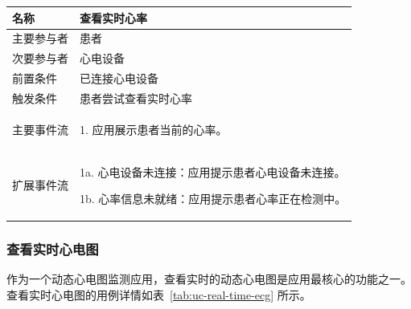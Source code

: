 \begin{table}[!ht]
    \label{tab:uc-heart-rate}
    \begin{tabularx}{\textwidth}{|l|X|}
        \hline
        名称    & 查看实时心率     \\
        \hline
        主要参与者 & 患者         \\
        \hline
        次要参与者 & 心电设备       \\
        \hline
        前置条件  & 已连接心电设备    \\
        \hline
        触发条件  & 患者尝试查看实时心率 \\
        \hline
        主要事件流 &
        \begin{itemizec}
            \item[1.] 应用展示患者当前的心率。
        \end{itemizec} \\
        \hline
        扩展事件流 &
        \begin{itemizec}
            \item[1a.] 心电设备未连接：应用提示患者心电设备未连接。
            \item[1b.] 心率信息未就绪：应用提示患者心率正在检测中。
        \end{itemizec} \\
        \hline
    \end{tabularx}
\end{table}

\subsubsection{查看实时心电图}

作为一个动态心电图监测应用，查看实时的动态心电图是应用最核心的功能之一。查看实时心电图的用例详情如表~\ref{tab:uc-real-time-ecg} 所示。

